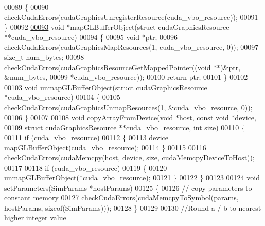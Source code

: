 \begin{DoxyCode}
00089     \{
00090         checkCudaErrors(cudaGraphicsUnregisterResource(cuda\_vbo\_resource));
00091     \}
00092 
\hypertarget{particle_system__cuda_8cu_source_l00093}{}\hyperlink{particle_system__cuda_8cu_aa491077afd740a269815eb9ce81c8642}{00093}     \textcolor{keywordtype}{void} *mapGLBufferObject(\textcolor{keyword}{struct} cudaGraphicsResource **cuda\_vbo\_resource)
00094     \{
00095         \textcolor{keywordtype}{void} *ptr;
00096         checkCudaErrors(cudaGraphicsMapResources(1, cuda\_vbo\_resource, 0));
00097         size\_t num\_bytes;
00098         checkCudaErrors(cudaGraphicsResourceGetMappedPointer((\textcolor{keywordtype}{void} **)&ptr, &num\_bytes,
00099                                                              *cuda\_vbo\_resource));
00100         \textcolor{keywordflow}{return} ptr;
00101     \}
00102 
\hypertarget{particle_system__cuda_8cu_source_l00103}{}\hyperlink{particle_system__cuda_8cu_a98c3325419b7528d34a51ca7972d7095}{00103}     \textcolor{keywordtype}{void} unmapGLBufferObject(\textcolor{keyword}{struct} cudaGraphicsResource *cuda\_vbo\_resource)
00104     \{
00105         checkCudaErrors(cudaGraphicsUnmapResources(1, &cuda\_vbo\_resource, 0));
00106     \}
00107 
\hypertarget{particle_system__cuda_8cu_source_l00108}{}\hyperlink{particle_system__cuda_8cu_a54716407dbd516db34f42b2faf7f91a3}{00108}     \textcolor{keywordtype}{void} copyArrayFromDevice(\textcolor{keywordtype}{void} *host, \textcolor{keyword}{const} \textcolor{keywordtype}{void} *device,
00109                              \textcolor{keyword}{struct} cudaGraphicsResource **cuda\_vbo\_resource, \textcolor{keywordtype}{int} size)
00110     \{
00111         \textcolor{keywordflow}{if} (cuda\_vbo\_resource)
00112         \{
00113             device = mapGLBufferObject(cuda\_vbo\_resource);
00114         \}
00115 
00116         checkCudaErrors(cudaMemcpy(host, device, size, cudaMemcpyDeviceToHost));
00117 
00118         \textcolor{keywordflow}{if} (cuda\_vbo\_resource)
00119         \{
00120             unmapGLBufferObject(*cuda\_vbo\_resource);
00121         \}
00122     \}
00123 
\hypertarget{particle_system__cuda_8cu_source_l00124}{}\hyperlink{particle_system__cuda_8cu_a342176dbaba2668312c45e1a1423fc4e}{00124}     \textcolor{keywordtype}{void} setParameters(SimParams *hostParams)
00125     \{
00126         \textcolor{comment}{// copy parameters to constant memory}
00127         checkCudaErrors(cudaMemcpyToSymbol(params, hostParams, \textcolor{keyword}{sizeof}(SimParams)));
00128     \}
00129 
00130     \textcolor{comment}{//Round a / b to nearest higher integer value}

\end{DoxyCode}
